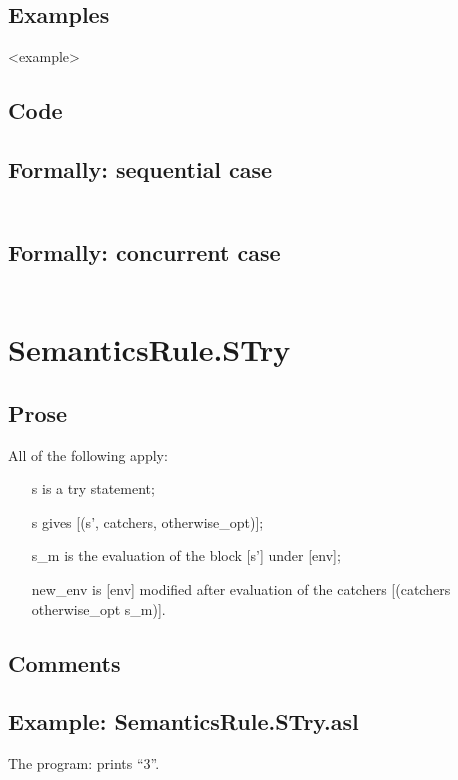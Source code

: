 \documentclass{book}
\begin{document}
    \subsection{Examples}
    <example>

  \subsection{Code}

  \subsection{Formally: sequential case}
  \begin{align}
  \end{align} 

  \subsection{Formally: concurrent case}
  \begin{align}
  \end{align} 

\section{SemanticsRule.STry \label{sec:SemanticsRule.STry}}

    \subsection{Prose}
    All of the following apply:
    \begin{itemize}
    \item [s] is a try statement;
    \item [s] gives [(s', catchers, otherwise\_opt)];
    \item [s\_m] is the evaluation of the block [s'] under [env];
    \item [new\_env] is [env] modified after evaluation of the catchers [(catchers
      otherwise\_opt s\_m)].
    \end{itemize}

    \subsection{Comments}

    \subsection{Example: SemanticsRule.STry.asl}
    The program:
    prints ``3''.
\end{document}
